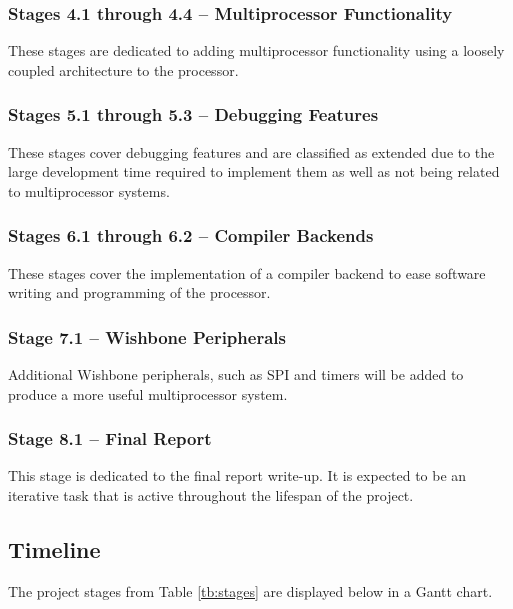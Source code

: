 \documentclass[11pt,a4paper]{report}
\begin{document}
{\subsubsection{Stages 4.1 through 4.4 -- Multiprocessor Functionality}
These stages are dedicated to adding multiprocessor functionality using a loosely coupled architecture to the processor.

\subsubsection{Stages 5.1 through 5.3 -- Debugging Features}
These stages cover debugging features and are classified as extended due to the large development time required to implement them as well as not being related to multiprocessor systems.

\subsubsection{Stages 6.1 through 6.2 -- Compiler Backends}
These stages cover the implementation of a compiler backend to ease software writing and programming of the processor.

\subsubsection{Stage 7.1 -- Wishbone Peripherals}
Additional Wishbone peripherals, such as SPI and timers will be added to produce a more useful multiprocessor system.

\subsubsection{Stage 8.1 -- Final Report}
This stage is dedicated to the final report write-up. It is expected to be an iterative task that is active throughout the lifespan of the project.

\subsection{Timeline}
The project stages from Table \ref{tb:stages} are displayed below in a Gantt chart.

}
\end{document}

